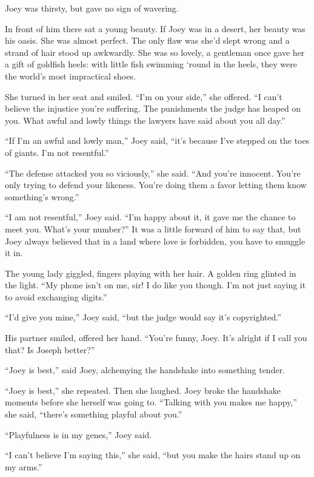 \documentclass[oneside]{book}
\begin{document}
Joey was thirsty, but gave no sign of wavering.

In front of him there sat a young beauty.  If Joey was in a desert,
her beauty was his oasis.
She was almost perfect.  The only flaw was she'd slept wrong and a
strand of hair stood up awkwardly.
She was so lovely, a gentleman once gave her a gift of goldfish heels:
with little fish swimming `round in the heels, they were the world's
most impractical shoes.

She turned in her seat and smiled.  ``I'm on your side,''
she offered.  ``I can't believe the injustice you're suffering.  The punishments the
judge has heaped on you.  What awful and lowly things the lawyers have said about you all day.''

``If I'm an awful and lowly man,'' Joey said, ``it's because I've stepped on the toes of giants.
I'm not resentful.''

``The defense attacked you so viciously,'' she said.  ``And you're innocent.
You're only trying to defend your likeness.  You're doing them a favor letting them know
something's wrong.''

``I am not resentful,'' Joey said.  ``I'm happy about it, it gave me the chance
to meet you.  What's your number?''
It was a little forward of him to say that, but
Joey always believed that in a land where love is
forbidden, you have to smuggle it in.

The young lady giggled, fingers playing with her hair.  A golden ring glinted in
the light.  ``My phone isn't on me, sir!
I do like you though.  I'm not just saying it to avoid exchanging digits.''

``I'd give you mine,'' Joey said, ``but the judge would say it's copyrighted.''

His partner smiled, offered her hand.  ``You're funny, Joey.  It's alright if I call you that?
Is Joseph better?''

``Joey is best,'' said Joey, alchemying the handshake into something tender.

``Joey is best,'' she repeated.  Then she laughed.
Joey broke the handshake moments before she herself was going to.
``Talking with you makes me happy,'' she said,
``there's something playful about you.''

``Playfulness is in my genes,'' Joey said.

``I can't believe I'm saying this,'' she said, ``but you make the hairs stand up on
my arms.''
\end{document}
